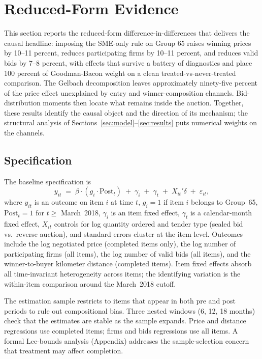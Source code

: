 \section{Reduced-Form Evidence}\label{sec:rf}

This section reports the reduced-form difference-in-differences that delivers the causal headline: imposing the SME-only rule on Group 65 raises winning prices by 10--11 percent, reduces participating firms by 10--11 percent, and reduces valid bids by 7--8 percent, with effects that survive a battery of diagnostics and place 100 percent of Goodman-Bacon weight on a clean treated-vs-never-treated comparison. The Gelbach decomposition leaves approximately ninety-five percent of the price effect unexplained by entry and winner-composition channels. Bid-distribution moments then locate what remains inside the auction. Together, these results identify the causal object and the direction of its mechanism; the structural analysis of Sections~\ref{sec:model}--\ref{sec:results} puts numerical weights on the channels.

\subsection{Specification}

The baseline specification is
\begin{equation}\label{eq:did}
  y_{it} \;=\; \beta \cdot (g_i \cdot \mathrm{Post}_t) \;+\; \gamma_i \;+\; \gamma_t \;+\; X_{it}'\delta \;+\; \varepsilon_{it},
\end{equation}
where $y_{it}$ is an outcome on item $i$ at time $t$, $g_i = 1$ if item $i$ belongs to Group~65, $\mathrm{Post}_t = 1$ for $t \geq$ March~2018, $\gamma_i$ is an item fixed effect, $\gamma_t$ is a calendar-month fixed effect, $X_{it}$ controls for log quantity ordered and tender type (sealed bid vs.\ reverse auction), and standard errors cluster at the item level. Outcomes include the log negotiated price (completed items only), the log number of participating firms (all items), the log number of valid bids (all items), and the winner-to-buyer kilometer distance (completed items). Item fixed effects absorb all time-invariant heterogeneity across items; the identifying variation is the within-item comparison around the March~2018 cutoff.

The estimation sample restricts to items that appear in both pre and post periods to rule out compositional bias. Three nested windows (6, 12, 18 months) check that the estimates are stable as the sample expands. Price and distance regressions use completed items; firms and bids regressions use all items. A formal Lee-bounds analysis (Appendix) addresses the sample-selection concern that treatment may affect completion.

